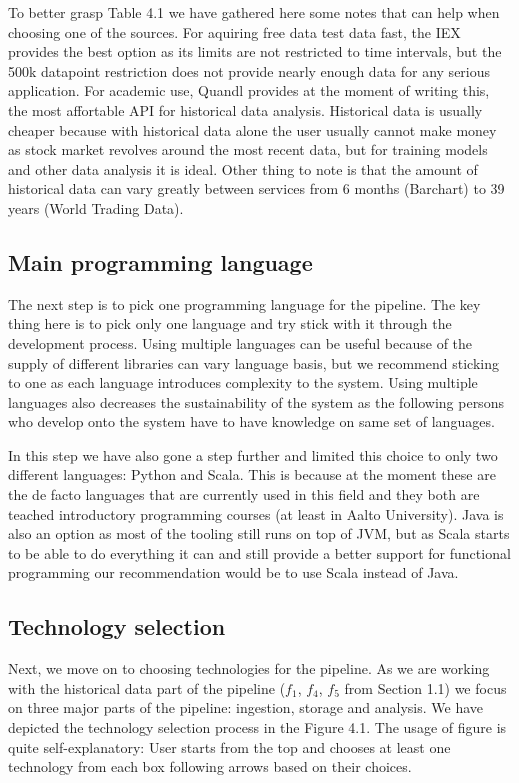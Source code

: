 To better grasp Table 4.1 we have gathered here some notes that can help when choosing one of the sources.
For aquiring free data test data fast, the IEX provides the best option as its limits are not restricted to time intervals, but the 500k datapoint restriction does not provide nearly enough data for any serious application.
For academic use, Quandl provides at the moment of writing this, the most affortable API for historical data analysis.
Historical data is usually cheaper because with historical data alone the user usually cannot make money as stock market revolves around the most recent data, but for training models and other data analysis it is ideal.
Other thing to note is that the amount of historical data can vary greatly between services from 6 months (Barchart) to 39 years (World Trading Data).

\subsection{Main programming language}

The next step is to pick one programming language for the pipeline.
The key thing here is to pick only one language and try stick with it through the development process.
Using multiple languages can be useful because of the supply of different libraries can vary language basis, but we recommend sticking to one as each language introduces complexity to the system.
Using multiple languages also decreases the sustainability of the system as the following persons who develop onto the system have to have knowledge on same set of languages.

In this step we have also gone a step further and limited this choice to only two different languages: Python and Scala.
This is because at the moment these are the de facto languages that are currently used in this field and they both are teached introductory programming courses (at least in Aalto University).
Java is also an option as most of the tooling still runs on top of JVM, but as Scala starts to be able to do everything it can and still provide a better support for functional programming our recommendation would be to use Scala instead of Java.

\subsection{Technology selection}

Next, we move on to choosing technologies for the pipeline.
As we are working with the historical data part of the pipeline ($f_1$, $f_4$, $f_5$ from Section 1.1) we focus on three major parts of the pipeline: ingestion, storage and analysis.
We have depicted the technology selection process in the Figure 4.1.
The usage of figure is quite self-explanatory:
User starts from the top and chooses at least one technology from each box following arrows based on their choices.

